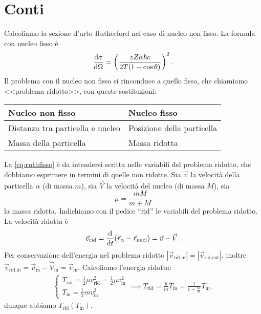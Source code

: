 \appendix
\section{Conti}
\label{sec:conti}

Calcoliamo la sezione d'urto Rutherford nel caso di nucleo non fisso.
La formula con nucleo fisso è
\begin{equation}
	\label{eq:ruthfisso}
	\frac{\mathrm{d} \sigma}{\mathrm{d} \Omega} = \left( \frac {zZ\alpha\hbar c} {2T(1-\cos\theta)} \right)^2.
\end{equation}
Il problema con il nucleo non fisso si rinconduce a quello fisso,
che chiamiamo <<problema ridotto>>, con queste sostituzioni:
\begin{center}
	\begin{tabular}{ll}
		Nucleo non fisso                 & Nucleo fisso               \\
		\hline
		Distanza tra particella e nucleo & Posizione della particella \\
		Massa della particella           & Massa ridotta              
	\end{tabular}
\end{center}
La \eqref{eq:ruthfisso} è da intendersi scritta nelle variabili del problema ridotto,
che dobbiamo esprimere in termini di quelle non ridotte.
Sia $\vec v$ la velocità della particella $\alpha$ (di massa $m$),
sia $\vec V$ la velocità del nucleo (di massa $M$), sia
\begin{equation*}
	\mu = \frac{mM}{m + M}
\end{equation*}
la massa ridotta.
Indichiamo con il pedice ``rid'' le variabili del problema ridotto.
La velocità ridotta è
\begin{equation*}
	\vec v_\text{rid} = \frac{\mathrm{d} }{\mathrm{d} t}(\vec r_\alpha - \vec r_\text{nucl}) = \vec v - \vec V.
\end{equation*}
Per conservazione dell'energia nel problema ridotto
$|\vec v_\text{rid,in}| = |\vec v_\text{rid,out}|$,
inoltre
$\vec v_\text{rid,in}
= \vec v_\text{in} - \vec V_\text{in}
= \vec v_\text{in}$.
Calcoliamo l'energia ridotta:
\begin{align*}
	\begin{cases}
		T_\text{rid} = \frac12 \mu v_\text{rid}^2 = \frac12 \mu v_\text{in}^2 \\
		T_\text{in}  = \frac12 m v_\text{in}^2
	\end{cases} \implies
	T_\text{rid} = \frac\mu m T_\text{in} = \frac1{1+\frac mM} T_\text{in},
\end{align*}
dunque abbiamo $T_\text{rid}(T_\text{in})$.
